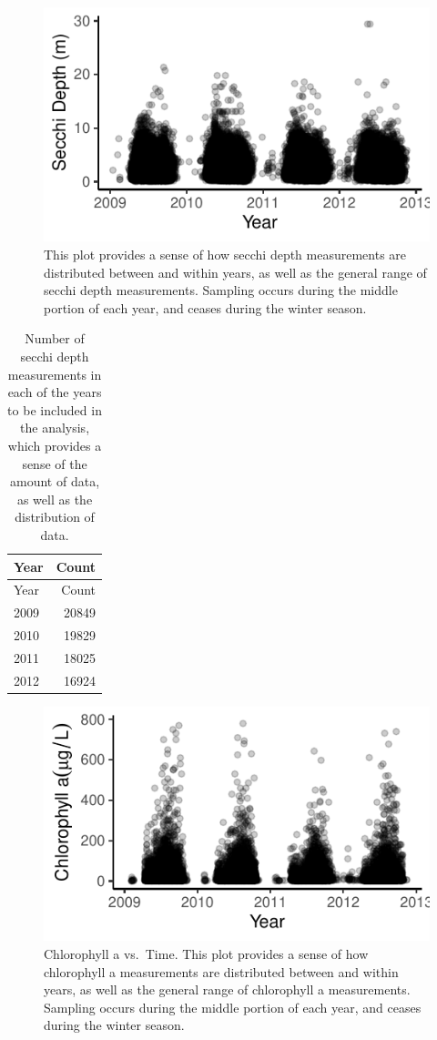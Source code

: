 \documentclass[12pt,]{article}
\begin{document}
\begin{figure}
\centering
\includegraphics{Bollt_Greif_Raby_Roth_Project_Final_files/figure-latex/Visualize_data-1.pdf}
\caption{This plot provides a sense of how secchi depth measurements are
distributed between and within years, as well as the general range of
secchi depth measurements. Sampling occurs during the middle portion of
each year, and ceases during the winter season.}
\end{figure}

\begin{longtable}[]{@{}lr@{}}
\caption{Number of secchi depth measurements in each of the years to be
included in the analysis, which provides a sense of the amount of data,
as well as the distribution of data.}\tabularnewline
\toprule
Year & Count\tabularnewline
\midrule
\endfirsthead
\toprule
Year & Count\tabularnewline
\midrule
\endhead
2009 & 20849\tabularnewline
2010 & 19829\tabularnewline
2011 & 18025\tabularnewline
2012 & 16924\tabularnewline
\bottomrule
\end{longtable}

\begin{figure}
\centering
\includegraphics{Bollt_Greif_Raby_Roth_Project_Final_files/figure-latex/unnamed-chunk-3-1.pdf}
\caption{Chlorophyll a vs.~Time. This plot provides a sense of how
chlorophyll a measurements are distributed between and within years, as
well as the general range of chlorophyll a measurements. Sampling occurs
during the middle portion of each year, and ceases during the winter
season.}
\end{figure}
\end{document}
